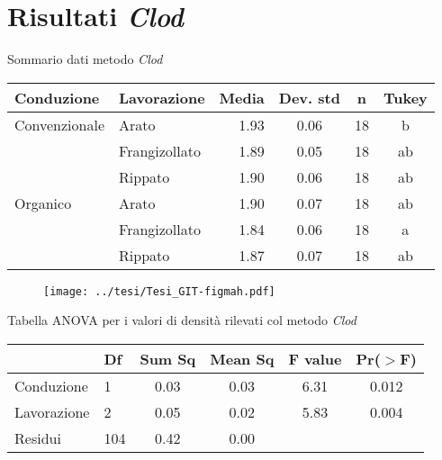 





\section{Risultati \emph{Clod}}

\begin{frame}{Sommario dati metodo \emph{Clod}}
  \footnotesize
  \begin{table}[ht]
    \centering
    \begin{tabular}{llrccc}
      \hline
      Conduzione & Lavorazione & Media & Dev. std & n & Tukey \\ 
      \hline
      Convenzionale & Arato & 1.93 & 0.06 &  18 & b \\ 
                 & Frangizollato & 1.89 & 0.05 &  18 & ab \\ 
                 & Rippato & 1.90 & 0.06 &  18 & ab \\ 
      Organico & Arato & 1.90 & 0.07 &  18 & ab \\ 
                 & Frangizollato & 1.84 & 0.06 &  18 & a \\ 
                 & Rippato & 1.87 & 0.07 &  18 & ab \\ 
      \hline
    \end{tabular}
    \label{tab:RiassuntoDensitaSpinta}
  \end{table}
\end{frame}

\begin{frame}
  \begin{figure}
    \texttt{[image: ../tesi/Tesi\_GIT-figmah.pdf]}
  \end{figure}
\end{frame}

\begin{frame}{Tabella ANOVA per i valori di densità rilevati col metodo \emph{Clod}}
  \begin{table}
    \centering
    \begin{tabular}{llcccc}
      \hline
      & Df & Sum Sq & Mean Sq & F value & Pr($>$F) \\ 
      \hline
      Conduzione & 1 & 0.03 & 0.03 & 6.31 & 0.012 \\ 
      Lavorazione & 2 & 0.05 & 0.02 & 5.83 & 0.004 \\ 
      Residui & 104 & 0.42 & 0.00 &  &  \\ 
      \hline
    \end{tabular}
    \label{tab:Anova densita per spinta}
  \end{table}
\end{frame}

